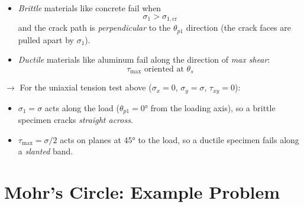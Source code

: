\documentclass[11pt]{article}
\begin{document}
\begin{itemize}
  \item \emph{Brittle} materials like concrete fail when
        \[ \boxed{\sigma_1 > \sigma_{1,\text{cr}}} \]
        and the crack path is \emph{perpendicular} to the $\theta_{p1}$ direction
        (the crack faces are pulled apart by $\sigma_1$).
  \item \emph{Ductile} materials like aluminum fail along the direction of
        \emph{max shear}:
        \[ \boxed{\tau_{\max} \text{ oriented at } \theta_s} \]
\end{itemize}

\noindent
$\rightarrow$ For the uniaxial tension test above ($\sigma_x = 0$, $\sigma_y = \sigma$,
$\tau_{xy} = 0$):
\begin{itemize}[label=\then]
  \item $\sigma_1 = \sigma$ acts along the load ($\theta_{p1} = \ang{0}$ from the loading
        axis), so a brittle specimen cracks \emph{straight across}.
  \item $\tau_{\max} = \sigma/2$ acts on planes at $\ang{45}$ to the load, so a ductile
        specimen fails along a \emph{slanted} band.
\end{itemize}


\section*{Mohr's Circle: Example Problem}
\end{document}
